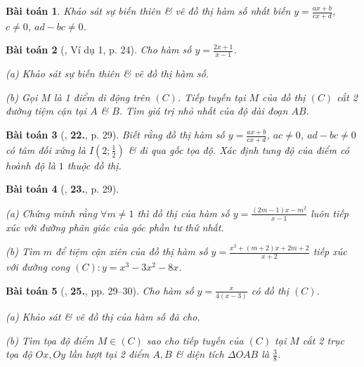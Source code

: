 \documentclass[12pt]{article}
\numberwithin{equation}{section}
\newtheorem{baitoan}{Bài toán}[section]
\begin{document}
\begin{baitoan}
	Khảo sát sự biến thiên \& vẽ đồ thị hàm số nhất biến $y = \frac{ax + b}{cx + d}$, $c\ne 0$, $ad - bc\ne 0$.
\end{baitoan}

\begin{baitoan}[\cite{TL_chuyen_Toan_Giai_Tich_12}, Ví dụ 1, p. 24]
	Cho hàm số $y = \frac{2x + 1}{x - 1}$.
	\begin{enumerate*}
		\item[(a)] Khảo sát sự biến thiên \& vẽ đồ thị hàm số.
		\item[(b)] Gọi $M$ là 1 điểm di động trên $(C)$. Tiếp tuyến tại $M$ của đồ thị $(C)$ cắt 2 đường tiệm cận tại $A$ \& $B$. Tìm giá trị nhỏ nhất của độ dài đoạn $AB$.
	\end{enumerate*}
\end{baitoan}

\begin{baitoan}[\cite{TL_chuyen_Toan_Giai_Tich_12}, \textbf{22.}, p. 29]
	Biết rằng đồ thị hàm số $y = \frac{ax + b}{cx + d}$, $ac\ne 0$, $ad - bc\ne 0$ có tâm đối xứng là $I\left(2;\frac{1}{2}\right)$ \& đi qua gốc tọa độ. Xác định tung độ của điểm có hoành độ là $1$ thuộc đồ thị.
\end{baitoan}

\begin{baitoan}[\cite{TL_chuyen_Toan_Giai_Tich_12}, \textbf{23.}, p. 29]
	\begin{enumerate*}
		\item[(a)] Chứng minh rằng $\forall m\ne 1$ thì đồ thị của hàm số $y = \frac{(2m - 1)x - m^2}{x - 1}$ luôn tiếp xúc với đường phân giác của góc phần tư thứ nhất.
		\item[(b)] Tìm $m$ để tiệm cận xiên của đồ thị hàm số $y = \frac{x^2 + (m + 2)x + 2m + 2}{x + 2}$ tiếp xúc với đường cong $(C):y = x^3 - 3x^2 - 8x$.
	\end{enumerate*}
\end{baitoan}

\begin{baitoan}[\cite{TL_chuyen_Toan_Giai_Tich_12}, \textbf{25.}, pp. 29--30]
	Cho hàm số $y = \frac{x}{4(x - 3)}$ có đồ thị $(C)$.
	\begin{enumerate*}
		\item[(a)] Khảo sát \& vẽ đồ thị của hàm số đã cho.
		\item[(b)] Tìm tọa độ điểm $M\in(C)$ sao cho tiếp tuyến của $(C)$ tại $M$ cắt 2 trục tọa độ $Ox,Oy$ lần lượt tại 2 điểm $A,B$ \& diện tích $\Delta OAB$ là $\frac{3}{8}$.
	\end{enumerate*}
\end{baitoan}
\end{document}
